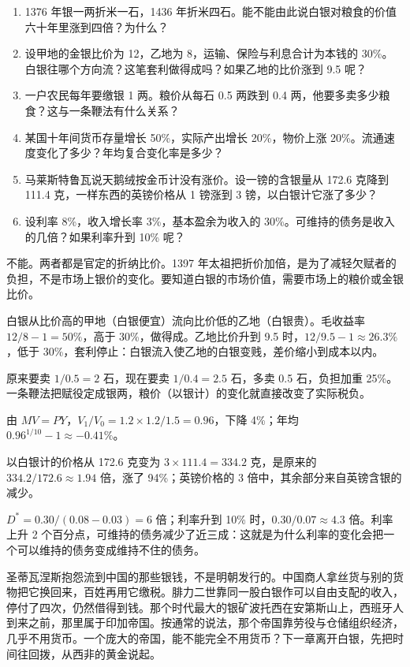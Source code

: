 \begin{selfcheck}
\begin{enumerate}
\item 1376 年银一两折米一石，1436 年折米四石。能不能由此说白银对粮食的价值六十年里涨到四倍？为什么？
\item 设甲地的金银比价为 12，乙地为 8，运输、保险与利息合计为本钱的 30\%。白银往哪个方向流？这笔套利做得成吗？如果乙地的比价涨到 9.5 呢？
\item 一户农民每年要缴银 1 两。粮价从每石 0.5 两跌到 0.4 两，他要多卖多少粮食？这与一条鞭法有什么关系？
\item 某国十年间货币存量增长 50\%，实际产出增长 20\%，物价上涨 20\%。流通速度变化了多少？年均复合变化率是多少？
\item 马莱斯特鲁瓦说天鹅绒按金币计没有涨价。设一镑的含银量从 172.6 克降到 111.4 克，一样东西的英镑价格从 1 镑涨到 3 镑，以白银计它涨了多少？
\item 设利率 8\%，收入增长率 3\%，基本盈余为收入的 30\%。可维持的债务是收入的几倍？如果利率升到 10\% 呢？
\end{enumerate}
\end{selfcheck}

\begin{answers}
\item 不能。两者都是官定的折纳比价。1397 年太祖把折价加倍，是为了减轻欠赋者的负担，不是市场上银价的变化。要知道白银的市场价值，需要市场上的粮价或金银比价。
\item 白银从比价高的甲地（白银便宜）流向比价低的乙地（白银贵）。毛收益率 $12/8-1=50\%$，高于 30\%，做得成。乙地比价升到 9.5 时，$12/9.5-1\approx26.3\%$，低于 30\%，套利停止：白银流入使乙地的白银变贱，差价缩小到成本以内。
\item 原来要卖 $1/0.5=2$ 石，现在要卖 $1/0.4=2.5$ 石，多卖 0.5 石，负担加重 25\%。一条鞭法把赋役定成银两，粮价（以银计）的变化就直接改变了实际税负。
\item 由 $MV=PY$，$V_1/V_0=1.2\times1.2/1.5=0.96$，下降 4\%；年均 $0.96^{1/10}-1\approx-0.41\%$。
\item 以白银计的价格从 172.6 克变为 $3\times111.4=334.2$ 克，是原来的 $334.2/172.6\approx1.94$ 倍，涨了 94\%；英镑价格的 3 倍中，其余部分来自英镑含银的减少。
\item $D^{*}=0.30/(0.08-0.03)=6$ 倍；利率升到 10\% 时，$0.30/0.07\approx4.3$ 倍。利率上升 2 个百分点，可维持的债务减少了近三成：这就是为什么利率的变化会把一个可以维持的债务变成维持不住的债务。
\end{answers}

圣蒂瓦涅斯抱怨流到中国的那些银钱，不是明朝发行的。中国商人拿丝货与别的货物把它换回来，百姓再用它缴税。腓力二世靠同一股白银作可以自由支配的收入，停付了四次，仍然借得到钱。那个时代最大的银矿波托西在安第斯山上，西班牙人到来之前，那里属于印加帝国。按通常的说法，那个帝国靠劳役与仓储组织经济，几乎不用货币。一个庞大的帝国，能不能完全不用货币？下一章离开白银，先把时间往回拨，从西非的黄金说起。

